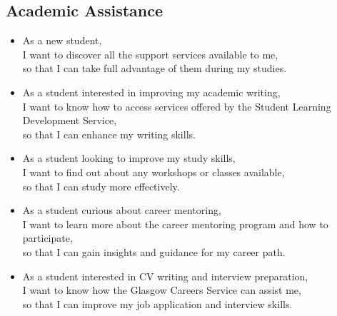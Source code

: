 \documentclass{l4proj}
\begin{document}
\begin{appendices}
\section*{Academic Assistance}
\begin{itemize}
    \item As a new student, \\I want to discover all the support services available to me, \\so that I can take full advantage of them during my studies.
    \vspace{1em}
    \item As a student interested in improving my academic writing, \\I want to know how to access services offered by the Student Learning Development Service, \\so that I can enhance my writing skills.
    \vspace{1em}
    \item As a student looking to improve my study skills, \\I want to find out about any workshops or classes available, \\so that I can study more effectively.
    \vspace{1em}
    \item As a student curious about career mentoring, \\I want to learn more about the career mentoring program and how to participate, \\so that I can gain insights and guidance for my career path.
    \vspace{1em}
    \item As a student interested in CV writing and interview preparation, \\I want to know how the Glasgow Careers Service can assist me, \\so that I can improve my job application and interview skills.
\end{itemize}


\end{appendices}
\end{document}
